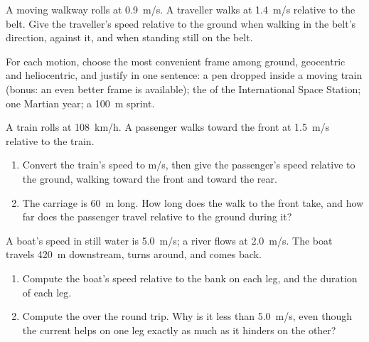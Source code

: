 \begin{exercise}[$\star$]\label{exo:g10:relative-motion:4}
A moving walkway rolls at \qty{0.9}{m/s}. A traveller walks at
\qty{1.4}{m/s} relative to the belt. Give the traveller's speed relative
to the ground when walking in the belt's direction, against it, and when
standing still on the belt.
\end{exercise}

\begin{exercise}[$\star$]\label{exo:g10:relative-motion:5}
For each motion, choose the most convenient frame among ground,
geocentric and heliocentric, and justify in one sentence: a pen dropped
inside a moving train (bonus: an even better frame is available); the
 of the International Space Station; one Martian year; a
\qty{100}{m} sprint.
\end{exercise}

\begin{exercise}[$\star\star$]\label{exo:g10:relative-motion:6}
A train rolls at \qty{108}{km/h}. A passenger walks toward the front at
\qty{1.5}{m/s} relative to the train.
\begin{enumerate}
  \item Convert the train's speed to \unit{m/s}, then give the
        passenger's speed relative to the ground, walking toward the
        front and toward the rear.
  \item The carriage is \qty{60}{m} long. How long does the walk to the
        front take, and how far does the passenger travel relative to
        the ground during it?
\end{enumerate}
\end{exercise}

\begin{exercise}[$\star\star$]\label{exo:g10:relative-motion:7}
A boat's speed in still water is \qty{5.0}{m/s}; a river flows at
\qty{2.0}{m/s}. The boat travels \qty{420}{m} downstream, turns around,
and comes back.
\begin{enumerate}
  \item Compute the boat's speed relative to the bank on each leg, and
        the duration of each leg.
  \item Compute the  over the round trip. Why is it less
        than \qty{5.0}{m/s}, even though the current helps on one leg
        exactly as much as it hinders on the other?
\end{enumerate}
\end{exercise}

